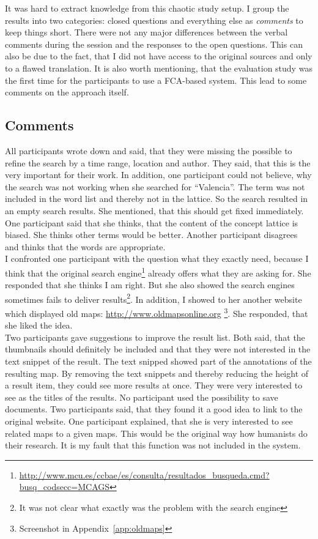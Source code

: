 \documentclass[11pt]{report}
\begin{document}
It was hard to extract knowledge from this chaotic study setup. I group the results into two categories: closed questions and everything else as \textit{comments} to keep things short. There were not any major differences between the verbal comments during the session and the responses to the open questions. This can also be due to the fact, that I did not have access to the original sources and only to a flawed translation. It is also worth mentioning, that the evaluation study was the first time for the participants to use a FCA-based system. This lead to some comments on the approach itself.

\subsection{Comments}
All participants wrote down and said, that they were missing the possible to refine the search by a time range, location and author. They said, that this is the very important for their work. In addition, one participant could not believe, why the search was not working when she searched for ``Valencia''. The term was not included in the word list and thereby not in the lattice. So the search resulted in an empty search results. She mentioned, that this should get fixed immediately. One participant said that she thinks, that the content of the concept lattice is biased. She thinks other terms would be better. Another participant disagrees and thinks that the words are appropriate. \\

I confronted one participant with the question what they exactly need, because I think that the original search engine\footnote{\url{http://www.mcu.es/ccbae/es/consulta/resultados_busqueda.cmd?busq_codsecc=MCAGS}} already offers what they are asking for. She responded that she thinks I am right. But she also showed the search engines sometimes fails to deliver results\footnote{It was not clear what exactly was the problem with the search engine}. In addition, I showed to her another website which displayed old maps: \url{http://www.oldmapsonline.org} \footnote{Screenshot in Appendix~\ref{app:oldmaps}}. She responded, that she liked the idea. \\

Two participants gave suggestions to improve the result list. Both said, that the thumbnails should definitely be included and that they were not interested in the text snippet of the result. The text snipped showed part of the annotations of the resulting map. By removing the text snippets and thereby reducing the height of a result item, they could see more results at once. They were very interested to see as the titles of the results. No participant used the possibility to save documents. Two participants said, that they found it a good idea to link to the original website. One participant explained, that she is very interested to see related maps to a given maps. This would be the original way how humanists do their research. It is my fault that this function was not included in the system. \\
\end{document}
